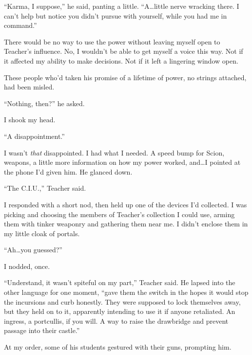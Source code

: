 ``Karma, I suppose,'' he said, panting a little.  ``A\ldots little nerve wracking there.  I can't help but notice you didn't pursue with yourself, while you had me in command.''



There would be no way to use the power without leaving myself open to Teacher's influence.  No, I wouldn't be able to get myself a voice this way.  Not if it affected my ability to make decisions.  Not if it left a lingering window open.



These people who'd taken his promise of a lifetime of power, no strings attached, had been misled.



``Nothing, then?'' he asked.



I shook my head.



``A disappointment.''



I wasn't \emph{that} disappointed.  I had what I needed.  A speed bump for Scion, weapons, a little more information on how my power worked, and\ldots  I pointed at the phone I'd given him.  He glanced down.



``The C.I.U.,'' Teacher said.



I responded with a short nod, then held up one of the devices I'd collected.  I was picking and choosing the members of Teacher's collection I could use, arming them with tinker weaponry and gathering them near me.  I didn't enclose them in my little cloak of portals.



``Ah\ldots you guessed?''



I nodded, once.



``Understand, it wasn't spiteful on my part,'' Teacher said.  He lapsed into the other language for one moment, ``\ldotsI gave them the switch in the hopes it would stop the incursions and curb honestly.  They were supposed to lock themselves away, but they held on to it, apparently intending to use it if anyone retaliated.  An ingress, a portcullis, if you will.  A way to raise the drawbridge and prevent passage into their castle.''



At my order, some of his students gestured with their guns, prompting him.



